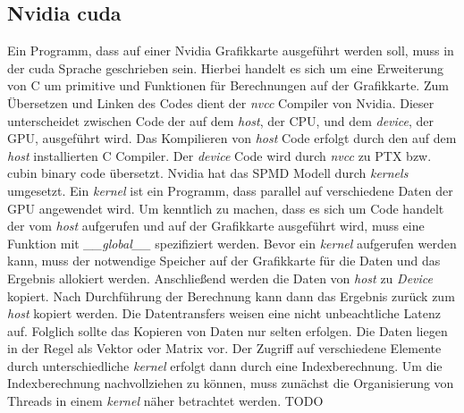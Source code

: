 \subsection{Nvidia cuda}

Ein Programm, dass auf einer Nvidia Grafikkarte ausgeführt werden soll, muss in der cuda Sprache geschrieben sein. Hierbei handelt es sich um eine Erweiterung von C um primitive und Funktionen für Berechnungen auf der Grafikkarte. Zum Übersetzen und Linken des Codes dient der \textit{nvcc} Compiler von Nvidia. Dieser unterscheidet zwischen Code der auf dem \textit{host}, der CPU, und dem \textit{device}, der GPU, ausgeführt wird. Das Kompilieren von \textit{host} Code erfolgt durch den auf dem \textit{host} installierten C Compiler. Der \textit{device} Code wird durch \textit{nvcc} zu PTX bzw. cubin binary code übersetzt.
Nvidia hat das SPMD Modell durch \textit{kernels} umgesetzt. Ein \textit{kernel} ist ein Programm, dass parallel auf verschiedene Daten der GPU angewendet wird. Um kenntlich zu machen, dass es sich um Code handelt der vom \textit{host} aufgerufen und auf der Grafikkarte ausgeführt wird, muss eine Funktion mit \textit{\_\_global\_\_} spezifiziert werden.
Bevor ein \textit{kernel} aufgerufen werden kann, muss der notwendige Speicher auf der Grafikkarte für die Daten und das Ergebnis allokiert werden. Anschließend werden die Daten von \textit{host} zu \textit{Device} kopiert. Nach Durchführung der Berechnung kann dann das Ergebnis zurück zum \textit{host} kopiert werden. Die Datentransfers weisen eine nicht unbeachtliche Latenz auf. Folglich sollte das Kopieren von Daten nur selten erfolgen.
Die Daten liegen in der Regel als Vektor oder Matrix vor. Der Zugriff auf verschiedene Elemente durch unterschiedliche \textit{kernel} erfolgt dann durch eine Indexberechnung.
Um die Indexberechnung nachvollziehen zu können, muss zunächst die Organisierung von Threads in einem \textit{kernel} näher betrachtet werden. TODO

